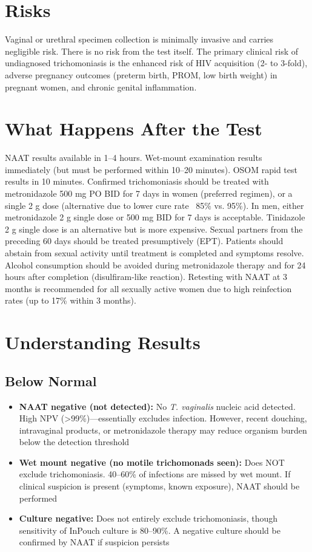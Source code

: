 \section*{Risks}
Vaginal or urethral specimen collection is minimally invasive and carries negligible risk. There is no risk from the test itself. The primary clinical risk of undiagnosed trichomoniasis is the enhanced risk of HIV acquisition (2- to 3-fold), adverse pregnancy outcomes (preterm birth, PROM, low birth weight) in pregnant women, and chronic genital inflammation.

\section*{What Happens After the Test}
NAAT results available in 1--4 hours. Wet-mount examination results immediately (but must be performed within 10--20 minutes). OSOM rapid test results in 10 minutes. Confirmed trichomoniasis should be treated with metronidazole 500 mg PO BID for 7 days in women (preferred regimen), or a single 2 g dose (alternative due to lower cure rate ~85\% vs. 95\%). In men, either metronidazole 2 g single dose or 500 mg BID for 7 days is acceptable. Tinidazole 2 g single dose is an alternative but is more expensive. Sexual partners from the preceding 60 days should be treated presumptively (EPT). Patients should abstain from sexual activity until treatment is completed and symptoms resolve. Alcohol consumption should be avoided during metronidazole therapy and for 24 hours after completion (disulfiram-like reaction). Retesting with NAAT at 3 months is recommended for all sexually active women due to high reinfection rates (up to 17\% within 3 months).

\section*{Understanding Results}

\subsection*{Below Normal}
\begin{itemize}
  \item \textbf{NAAT negative (not detected):} No \textit{T. vaginalis} nucleic acid detected. High NPV (>99\%)---essentially excludes infection. However, recent douching, intravaginal products, or metronidazole therapy may reduce organism burden below the detection threshold
  \item \textbf{Wet mount negative (no motile trichomonads seen):} Does NOT exclude trichomoniasis. 40--60\% of infections are missed by wet mount. If clinical suspicion is present (symptoms, known exposure), NAAT should be performed
  \item \textbf{Culture negative:} Does not entirely exclude trichomoniasis, though sensitivity of InPouch culture is 80--90\%. A negative culture should be confirmed by NAAT if suspicion persists
\end{itemize}

